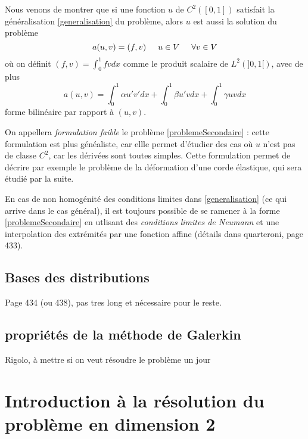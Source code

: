 \documentclass[12pt]{article}
\newcommand{\espace}{\hspace{5mm}}
\begin{document}
Nous venons de montrer que si une fonction $u$ de $C^2([0,1])$ satisfait la généralisation \eqref{generalisation} du problème, alors $u$ est aussi la solution du problème
\begin{equation} \label{problemeSecondaire}
a(u,v) = (f,v) \espace u \in V \espace \forall v \in V
\end{equation}
où on définit $(f,v) = \int_0^1 fv dx$ comme le produit scalaire de $L^2(]0,1[)$, avec de plus
\begin{equation}
a(u,v) = \int_0^1 \alpha u' v' dx + \int_0^1 \beta u' v dx + \int_0^1 \gamma u v dx
\end{equation}
forme bilinéaire par rapport à $(u,v)$.

On appellera \emph{formulation faible} le problème \eqref{problemeSecondaire} : cette formulation est plus généaliste, car ellle permet d'étudier des cas où $u$ n'est pas de classe $C^2$, car les dérivées sont toutes simples. Cette formulation permet de décrire par exemple le problème de la déformation d'une corde élastique, qui sera étudié par la suite.

En cas de non homogénité des conditions limites dans \eqref{generalisation} (ce qui arrive dans le cas général), il est toujours possible de se ramener à la forme \eqref{problemeSecondaire} en utlisant des \emph{conditions limites de Neumann} et une interpolation des extrémités par une fonction affine (détails dans quarteroni, page 433).

\subsection{Bases des distributions}

Page 434 (ou 438), pas tres long et nécessaire pour le reste.

\subsection{propriétés de la méthode de Galerkin}
Rigolo, à mettre si on veut résoudre le problème un jour









\section{Introduction à la résolution du problème en dimension 2}
\end{document}
